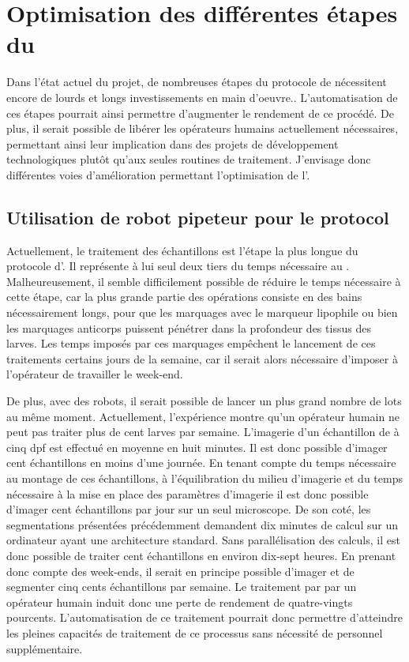 \documentclass[\main/main.tex]{subfiles}
\begin{document}
                    
\section{
    \label{sec:automatisation}
    Optimisation des différentes étapes du \hti
    }
 
%   
Dans l'état actuel du projet, de nombreuses étapes du protocole de \hti{} nécessitent encore de lourds et longs investissements en main d'oeuvre..
%
L'automatisation de ces étapes pourrait ainsi permettre d'augmenter le rendement de ce procédé.
%
De plus, il serait possible de libérer les opérateurs humains actuellement nécessaires,
permettant ainsi leur implication dans des projets de développement technologiques plutôt qu'aux seules routines de traitement.
%
J'envisage donc différentes voies d'amélioration permettant l'optimisation de l'\hti{}.

    \subsection[Par robots pipeteurs]{Utilisation de robot pipeteur pour le protocol \ihc{}}
    
%
Actuellement, le traitement \ihc{} des échantillons est l'étape la plus longue du protocole d'\hti{}.
%
Il représente à lui seul deux tiers du temps nécessaire au \hcs{}.
%
Malheureusement, il semble difficilement possible de réduire le temps nécessaire à cette étape,
car la plus grande partie des opérations consiste en des bains nécessairement longs,
pour que les marquages avec le marqueur lipophile ou bien les marquages anticorps puissent pénétrer dans la profondeur des tissus des larves.
%
Les temps imposés par ces marquages empêchent le lancement de ces traitements certains jours de la semaine,
car il serait alors nécessaire d'imposer à l'opérateur de travailler le week-end.

De plus, avec des robots,  il serait possible de lancer un plus grand nombre de lots au même moment.
%
Actuellement, l'expérience montre qu'un opérateur humain ne peut pas traiter plus de cent larves par semaine.
%
L'imagerie d'un échantillon de \pz à cinq dpf est effectué en moyenne en huit minutes.
%
Il est donc possible d'imager cent échantillons en moins d'une journée.
%
En tenant compte du temps nécessaire au montage de ces échantillons,
à l'équilibration du milieu d'imagerie et du temps nécessaire à la mise en place des paramètres d'imagerie
il est donc possible d'imager cent échantillons par jour sur un seul microscope. 
%
De son coté, les segmentations présentées précédemment demandent dix minutes de calcul sur un ordinateur ayant une architecture standard.
%
Sans parallélisation des calculs, il est donc possible de traiter cent échantillons en environ dix-sept heures.
%
En prenant donc compte des week-ends, il serait en principe possible d'imager et de segmenter cinq cents échantillons par semaine.
%
Le traitement par \ihc{} par un opérateur humain induit donc une perte de rendement de quatre-vingts pourcents.
%
L'automatisation de ce traitement pourrait donc permettre d'atteindre les pleines capacités de traitement de ce processus sans nécessité de personnel supplémentaire.
\end{document}
